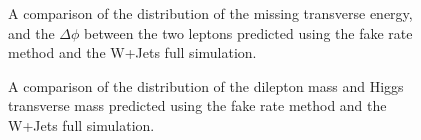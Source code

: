 \begin{figure}[!htbp]
\begin{center}
\caption{A comparison of the distribution of the missing transverse energy, 
and the $\Delta\phi$ between the two leptons predicted using the fake rate method and the
W+Jets full simulation.}
\label{fig:FakeBkgDataDistribution_MetAndDeltaPhi}
\end{center}
\end{figure}

\begin{figure}[!htbp]
\begin{center}
\caption{A comparison of the distribution of the dilepton mass and Higgs transverse mass 
predicted using the fake rate method and the W+Jets full simulation.}
\label{fig:FakeBkgDataDistribution_DileptonMassAndMtHiggs}
\end{center}
\end{figure}



